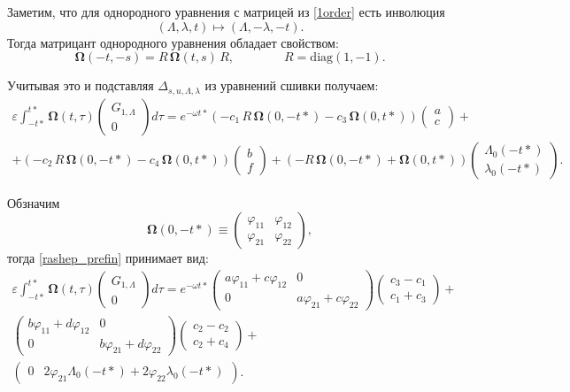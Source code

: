 Заметим, что для однородного уравнения с матрицей из \eqref{1order} есть инволюция
$$
(\Lambda,\lambda,t)
\mapsto
(\Lambda,-\lambda,-t).
$$
Тогда матрицант однородного уравнения обладает свойством:
$$
\mathbf{\Omega}(-t,-s)=R \, \mathbf{\Omega}(t,s) \, R, \qquad \qquad R = \text{diag}(1,-1).
$$

Учитывая это и подставляя $\Delta_{s,u,\Lambda,\lambda}$ из уравнений сшивки получаем:
\begin{multline}
\varepsilon \int_{-t*}^{t*} \mathbf{\Omega}(t, \tau) \begin{pmatrix} G_{1, \Lambda} \\ 0 \end{pmatrix} d\tau
=
e^{- \omega t*} \left( - c_1 \, R \, \mathbf{\Omega}(0,-t*) - c_3 \, \mathbf{\Omega}(0,t*) \right) \begin{pmatrix} a \\ c \end{pmatrix} + \\
+ \left( - c_2 \, R \, \mathbf{\Omega}(0,-t*) - c_4 \, \mathbf{\Omega}(0,t*) \right) \begin{pmatrix} b \\ f \end{pmatrix} +
\left( - R \, \mathbf{\Omega}(0,-t*) + \mathbf{\Omega}(0,t*) \right) \begin{pmatrix} \Lambda_0(-t*) \\ \lambda_0(-t*) \end{pmatrix}.
\label{rashep_prefin}
\end{multline}

Обзначим
$$
\mathbf{\Omega}(0, -t*) \equiv \begin{pmatrix}
\varphi_{11} & \varphi_{12} \\
\varphi_{21} & \varphi_{22}
\end{pmatrix},
$$
тогда \eqref{rashep_prefin} принимает вид:
\begin{multline}
\varepsilon \int_{-t*}^{t*} \mathbf{\Omega}(t, \tau) \begin{pmatrix} G_{1, \Lambda} \\ 0 \end{pmatrix} d\tau
=
e^{- \omega t*} \begin{pmatrix} a \varphi_{11}+ c \varphi_{12} & 0 \\ 0 & a \varphi_{21}+ c \varphi_{22} \end{pmatrix} \begin{pmatrix} c_3-c_1 \\ c_1+c_3 \end{pmatrix} + \\
\begin{pmatrix} b \varphi_{11}+ d \varphi_{12} & 0 \\ 0 & b \varphi_{21}+ d \varphi_{22} \end{pmatrix} \begin{pmatrix} c_2-c_2 \\ c_2+c_4 \end{pmatrix} + \\
\begin{pmatrix} 0 & 2 \varphi_{21} \Lambda_0(-t*) + 2 \varphi_{22} \lambda_0(-t*) \end{pmatrix}.
\label{rashep_fin}
\end{multline}